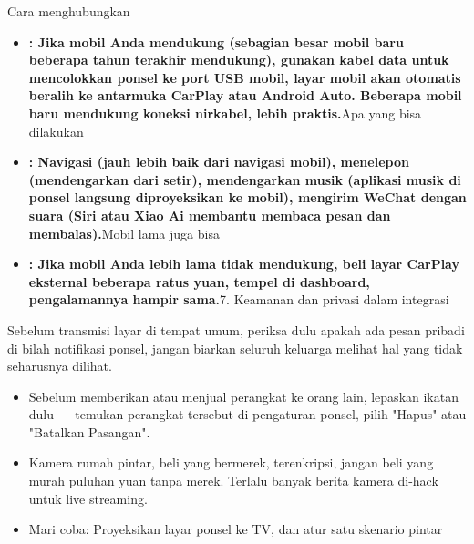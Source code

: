 
Cara menghubungkan

\begin{itemize}
  \item \textbf{: Jika mobil Anda mendukung (sebagian besar mobil baru beberapa tahun terakhir mendukung), gunakan kabel data untuk mencolokkan ponsel ke port USB mobil, layar mobil akan otomatis beralih ke antarmuka CarPlay atau Android Auto. Beberapa mobil baru mendukung koneksi nirkabel, lebih praktis.}Apa yang bisa dilakukan
  \item \textbf{: Navigasi (jauh lebih baik dari navigasi mobil), menelepon (mendengarkan dari setir), mendengarkan musik (aplikasi musik di ponsel langsung diproyeksikan ke mobil), mengirim WeChat dengan suara (Siri atau Xiao Ai membantu membaca pesan dan membalas).}Mobil lama juga bisa
  \item \textbf{: Jika mobil Anda lebih lama tidak mendukung, beli layar CarPlay eksternal beberapa ratus yuan, tempel di dashboard, pengalamannya hampir sama.}7. Keamanan dan privasi dalam integrasi
\end{itemize}


Sebelum transmisi layar di tempat umum, periksa dulu apakah ada pesan pribadi di bilah notifikasi ponsel, jangan biarkan seluruh keluarga melihat hal yang tidak seharusnya dilihat.

\begin{itemize}
  \item Sebelum memberikan atau menjual perangkat ke orang lain, lepaskan ikatan dulu — temukan perangkat tersebut di pengaturan ponsel, pilih "Hapus" atau "Batalkan Pasangan".
  \item Kamera rumah pintar, beli yang bermerek, terenkripsi, jangan beli yang murah puluhan yuan tanpa merek. Terlalu banyak berita kamera di-hack untuk live streaming.
  \item Mari coba: Proyeksikan layar ponsel ke TV, dan atur satu skenario pintar
\end{itemize}

